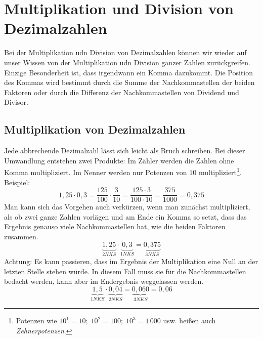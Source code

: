 	\section{Multiplikation und Division von Dezimalzahlen}\vspace{-1em}
Bei der Multiplikation udn Division von Dezimalzahlen können wir wieder auf unser Wissen von der Multiplikation udn Division ganzer Zahlen zurückgreifen. Einzige Besonderheit ist, dass irgendwann ein Komma dazukommt. Die Position des Kommas wird bestimmt durch die Summe der Nachkommastellen der beiden Faktoren oder durch die Differenz der Nachkommastellen von Dividend und Divisor.

\subsection{Multiplikation von Dezimalzahlen}\vspace{-1em}
Jede abbrechende Dezimalzahl lässt sich leicht als Bruch schreiben. Bei dieser Umwandlung entstehen zwei Produkte: Im Zähler werden die Zahlen ohne Komma multipliziert. Im Nenner werden nur Potenzen von $10$ multipliziert\footnote{Potenzen wie $10^1=10;\; 10^2=100;\; 10^3=1\,000$ usw. heißen auch \emph{Zehnerpotenzen}.}.
%
Beispiel:
\begin{equation*}
	1{,}25\cdot 0{,}3 = \frac{125}{100}\cdot\frac{3}{10}= \frac{125\cdot3}{100\cdot10}= \frac{375}{1000}=0{,}375
\end{equation*}
Man kann sich das Vorgehen auch verkürzen, wenn man zunächst multipliziert, als ob zwei ganze Zahlen vorlägen und am Ende ein Komma so setzt, dass das Ergebnis genauso viele Nachkommastellen hat, wie die beiden Faktoren zusammen.
\begin{equation*}
	\underbrace{1{,}25}_{2 NKS}\cdot \underbrace{0{,}3}_{1 NKS} = \underbrace{0{,}375}_{3 NKS}
\end{equation*}
%
Achtung: Es kann passieren, dass im Ergebnis der Multiplikation eine Null an der letzten Stelle stehen würde. In diesem Fall muss sie für die Nachkommastellen bedacht werden, kann aber im Endergebnis weggelassen werden.
\begin{equation*}
	\underbrace{1{,}5}_{1 NKS}\cdot \underbrace{0{,}04}_{2 NKS} = \underbrace{0{,}060}_{3NKS} = 0{,}06
\end{equation*}


